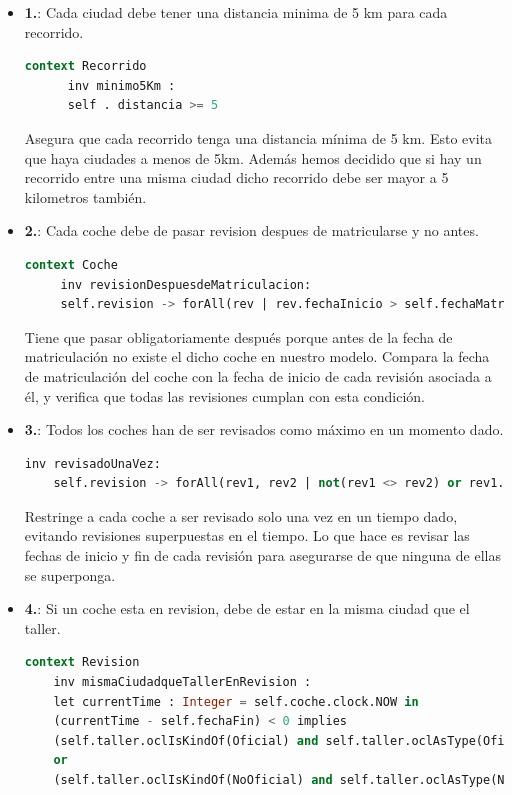 \documentclass[12pt.a4paper]{article}
\begin{document}
\begin{itemize}
    \item \textbf{1.}: Cada ciudad debe tener una distancia minima de 5 km para cada recorrido.
    \begin{lstlisting}[style = useEspecifico,language=SQL]
    context Recorrido
      inv minimo5Km :
      self . distancia >= 5
    \end{lstlisting}
    Asegura que cada recorrido tenga una distancia mínima de 5 km. Esto evita que haya ciudades a menos de 5km. Además hemos decidido que si hay un recorrido entre una misma ciudad dicho recorrido debe ser mayor a 5 kilometros también.
    
    \item \textbf{2.}: Cada coche debe de pasar revision despues de matricularse y no antes.
    \begin{lstlisting}[style = useEspecifico,language=SQL]
   context Coche
     inv revisionDespuesdeMatriculacion:
     self.revision -> forAll(rev | rev.fechaInicio > self.fechaMatriculacion)
    \end{lstlisting}
    Tiene que pasar obligatoriamente después porque antes de la fecha de matriculación no existe el dicho coche en nuestro modelo.
    Compara la fecha de matriculación del coche con la fecha de inicio de cada revisión asociada a él, y verifica que todas las revisiones cumplan con esta condición. 
    
    \item \textbf{3.}: Todos los coches han de ser revisados como máximo en un momento dado.
    \begin{lstlisting}[style = useEspecifico,language=SQL]
    inv revisadoUnaVez:
    self.revision -> forAll(rev1, rev2 | not(rev1 <> rev2) or rev1.fechaInicio <> rev2.fechaInicio and (rev1.fechaInicio >= rev2.fechaFin or rev2.fechaInicio >= rev1.fechaFin))
    \end{lstlisting}
    Restringe a cada coche a ser revisado solo una vez en un tiempo dado, evitando revisiones superpuestas en el tiempo.
    Lo que hace es revisar las fechas de inicio y fin de cada revisión para asegurarse de que ninguna de ellas se superponga.
    
    \item \textbf{4.}: Si un coche esta en revision, debe de estar en la misma ciudad que el taller.
    \begin{lstlisting}[style = useEspecifico,language=SQL]
    context Revision
    inv mismaCiudadqueTallerEnRevision :
    let currentTime : Integer = self.coche.clock.NOW in   
    (currentTime - self.fechaFin) < 0 implies
    (self.taller.oclIsKindOf(Oficial) and self.taller.oclAsType(Oficial).ciudad = self.coche.ciudad) 
    or 
    (self.taller.oclIsKindOf(NoOficial) and self.taller.oclAsType(NoOficial).ciudad = self.coche.ciudad) 
        

\end{lstlisting}
\end{itemize}
\end{document}
